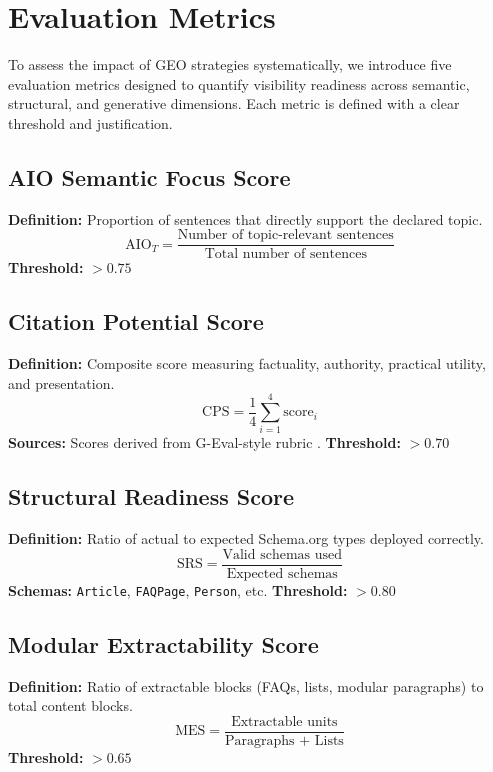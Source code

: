 \section{Evaluation Metrics}

To assess the impact of GEO strategies systematically, we introduce five evaluation metrics designed to quantify visibility readiness across semantic, structural, and generative dimensions. Each metric is defined with a clear threshold and justification.

\subsection{AIO Semantic Focus Score}
\textbf{Definition:} Proportion of sentences that directly support the declared topic.
\begin{equation}
\text{AIO}_{T} = \frac{\text{Number of topic-relevant sentences}}{\text{Total number of sentences}}
\end{equation}
\textbf{Threshold:} $> 0.75$

\subsection{Citation Potential Score}
\textbf{Definition:} Composite score measuring factuality, authority, practical utility, and presentation.
\begin{equation}
\text{CPS} = \frac{1}{4}\sum_{i=1}^{4} \text{score}_i
\end{equation}
\textbf{Sources:} Scores derived from G-Eval-style rubric \cite{liu2023verifiability, menick2022quotes}.
\textbf{Threshold:} $> 0.70$

\subsection{Structural Readiness Score}
\textbf{Definition:} Ratio of actual to expected Schema.org types deployed correctly.
\begin{equation}
\text{SRS} = \frac{\text{Valid schemas used}}{\text{Expected schemas}}
\end{equation}
\textbf{Schemas:} \texttt{Article}, \texttt{FAQPage}, \texttt{Person}, etc.
\textbf{Threshold:} $> 0.80$

\subsection{Modular Extractability Score}
\textbf{Definition:} Ratio of extractable blocks (FAQs, lists, modular paragraphs) to total content blocks.
\begin{equation}
\text{MES} = \frac{\text{Extractable units}}{\text{Paragraphs + Lists}}
\end{equation}
\textbf{Threshold:} $> 0.65$

